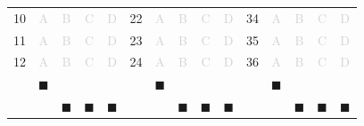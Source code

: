 \documentclass[a4paper,11pt]{article}
\newcommand{\light}[1]{\textcolor{lightgray}{#1}}
\begin{document}
\begin{center}
\begin{tabular}{r|c|c|c|c|r|c|c|c|c|r|c|c|c|c|}
\cline{2-5} \cline{7-10} \cline{12-15}
10& \light{A} & \light{B} & \light{C} & \light{D} & 22& \light{A} & \light{B} & \light{C} & \light{D} & 34& \light{A} & \light{B} & \light{C} & \light{D} \\
\cline{2-5} \cline{7-10} \cline{12-15}
11& \light{A} & \light{B} & \light{C} & \light{D} & 23& \light{A} & \light{B} & \light{C} & \light{D} & 35& \light{A} & \light{B} & \light{C} & \light{D} \\
\cline{2-5} \cline{7-10} \cline{12-15}
12& \light{A} & \light{B} & \light{C} & \light{D} & 24& \light{A} & \light{B} & \light{C} & \light{D} & 36& \light{A} & \light{B} & \light{C} & \light{D} \\
\cline{2-5} \cline{7-10} \cline{12-15}
\multicolumn{1}{c}{} & \multicolumn{1}{c}{$\blacksquare$} & \multicolumn{1}{c}{} & \multicolumn{1}{c}{} & \multicolumn{1}{c}{} & \multicolumn{1}{c}{} & \multicolumn{1}{c}{$\blacksquare$} & \multicolumn{1}{c}{} & \multicolumn{1}{c}{} & \multicolumn{1}{c}{} & \multicolumn{1}{c}{} & \multicolumn{1}{c}{$\blacksquare$} & \multicolumn{1}{c}{} & \multicolumn{1}{c}{} & \multicolumn{1}{c}{}\\ 
\multicolumn{1}{c}{} & \multicolumn{1}{c}{} & \multicolumn{1}{c}{$\blacksquare$} & \multicolumn{1}{c}{$\blacksquare$} & \multicolumn{1}{c}{$\blacksquare$} & \multicolumn{1}{c}{} & \multicolumn{1}{c}{} & \multicolumn{1}{c}{$\blacksquare$} & \multicolumn{1}{c}{$\blacksquare$} & \multicolumn{1}{c}{$\blacksquare$} & \multicolumn{1}{c}{} & \multicolumn{1}{c}{} & \multicolumn{1}{c}{$\blacksquare$} & \multicolumn{1}{c}{$\blacksquare$} & \multicolumn{1}{c}{$\blacksquare$}\\ 
\end{tabular}
\end{center}
\end{document}
